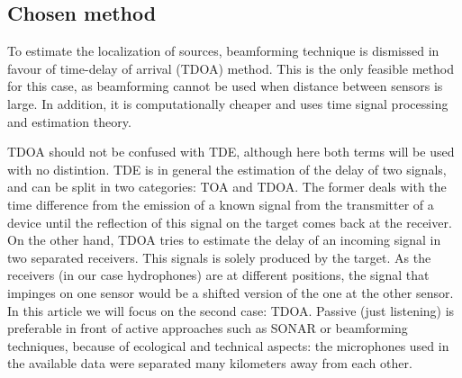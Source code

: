 \subsection{Chosen method}
To estimate the localization of sources, beamforming technique is dismissed in favour of time-delay of arrival (TDOA) method. This is the only feasible method for this case, as beamforming cannot be used when distance between sensors is large. In addition, it is computationally cheaper and uses time signal processing and estimation theory.

TDOA should not be confused with TDE, although here both terms will be used with no distintion. TDE is in general the estimation of the delay of two signals, and can be split in two categories: TOA and TDOA. The former deals with the time difference from the emission of a known signal from the transmitter of a device until the reflection of this signal on the target comes back at the receiver. On the other hand, TDOA tries to estimate the delay of an incoming signal in two separated receivers. This signals is solely produced by the target. As the receivers (in our case hydrophones) are at different positions, the signal that impinges on one sensor would be a shifted version of the one at the other sensor. In this article we will focus on the second case: TDOA. Passive (just listening) is preferable in front of active approaches such as SONAR or beamforming techniques, because of ecological and technical aspects: the microphones used in the available data were separated many kilometers away from each other.

